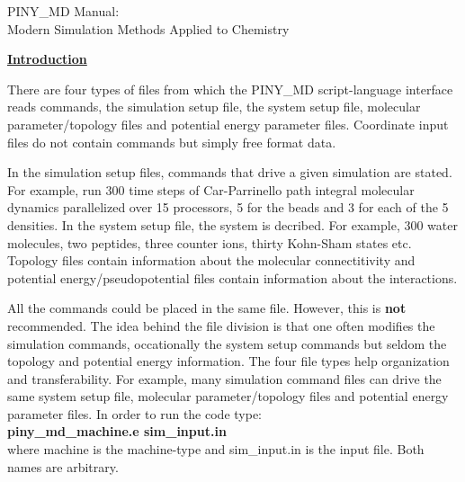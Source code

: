 
\setlength{\topmargin}{0mm}
\setlength{\footheight}{0mm}
\setlength{\textheight}{210mm}
\setlength{\textwidth}{160mm}

\large
\parskip=0.15in


\vspace*{3.in}
\begin{center}
\huge
PINY\_MD Manual: \\
$\ $ \\
\Large
Modern Simulation Methods Applied to Chemistry
\end{center}

\clearpage
\huge
\underline{\bf Introduction}
\large

There are four types of files from which the PINY\_MD 
script-language interface reads commands, the
simulation setup file, the system setup file, molecular parameter/topology
files and potential energy parameter files. Coordinate input files 
do not contain commands but simply free format data. 

In the simulation setup files, commands that drive a given simulation
are stated. For example, run 300 time steps of Car-Parrinello path
integral molecular dynamics parallelized over 15 processors, 5 for
the beads and 3 for each of the 5 densities. In the system setup file, the 
system is decribed. For example,
300 water molecules, two peptides, three counter ions, thirty Kohn-Sham
states etc.  Topology files contain information about the molecular
connectitivity and potential energy/pseudopotential files contain
information about the interactions.

All the commands could be placed in the same file. However, this is {\bf not} 
recommended. The idea behind the file division is that one often modifies the
simulation commands, occationally the system setup commands but seldom the 
topology and potential energy information. The four file types help
organization and transferability. For example, many simulation command files 
can drive the same system setup file, 
molecular parameter/topology files and potential energy parameter files.
In order to run the code type: \\
\hspace*{1.5in} {\bf piny\_md\_machine.e sim\_input.in} \\
where machine is the machine-type and sim\_input.in 
is the input file. Both names are arbitrary.


